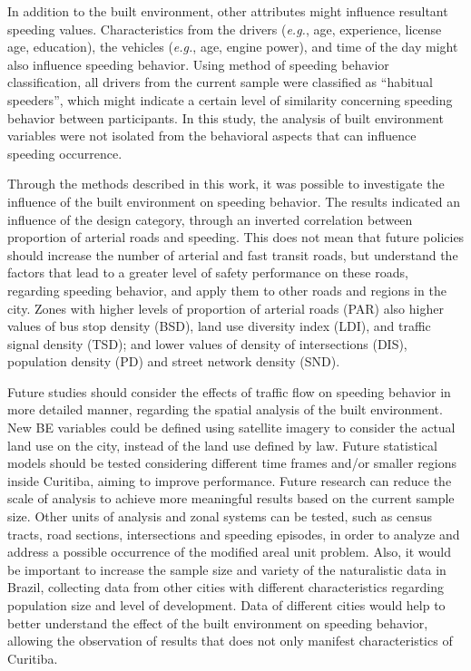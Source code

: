 In addition to the built environment, other attributes might influence resultant speeding values. Characteristics from the drivers (\textit{e.g.}, age, experience, license age, education), the vehicles (\textit{e.g.}, age, engine power), and time of the day might also influence speeding behavior. Using \textcite{Richard2013a} method of speeding behavior classification, all drivers from the current sample were classified as ``habitual speeders'', which might indicate a certain level of similarity concerning speeding behavior between participants. In this study, the analysis of built environment variables were not isolated from the behavioral aspects that can influence speeding occurrence.

Through the methods described in this work, it was possible to investigate the influence of the built environment on speeding behavior. The results indicated an influence of the design category, through an inverted correlation between proportion of arterial roads and speeding. This does not mean that future policies should increase the number of arterial and fast transit roads, but understand the factors that lead to a greater level of safety performance on these roads, regarding speeding behavior, and apply them to other roads and regions in the city. Zones with higher levels of proportion of arterial roads (PAR) also higher values of bus stop density (BSD), land use diversity index (LDI), and traffic signal density (TSD); and lower values of density of intersections (DIS), population density (PD) and street network density (SND).

Future studies should consider the effects of traffic flow on speeding behavior in more detailed manner, regarding the spatial analysis of the built environment. New BE variables could be defined using satellite imagery to consider the actual land use on the city, instead of the land use defined by law. Future statistical models should be tested considering different time frames and/or smaller regions inside Curitiba, aiming to improve performance. Future research can reduce the scale of analysis to achieve more meaningful results based on the current sample size. Other units of analysis and zonal systems can be tested, such as census tracts, road sections, intersections and speeding episodes, in order to analyze and address a possible occurrence of the modified areal unit problem. Also, it would be important to increase the sample size and variety of the naturalistic data in Brazil, collecting data from other cities with different characteristics regarding population size and level of development. Data of different cities would help to better understand the effect of the built environment on speeding behavior, allowing the observation of results that does not only manifest characteristics of Curitiba.
